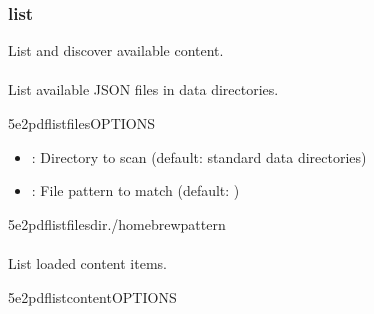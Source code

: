 \documentclass[letterpaper,10pt,english]{sphinxmanual}
\begin{document}
\subsubsection{list}
\label{\detokenize{user-guide/cli-reference:list}}
\sphinxAtStartPar
List and discover available content.


\paragraph{}
\label{\detokenize{user-guide/cli-reference:files}}
\sphinxAtStartPar
List available JSON files in data directories.

\begin{sphinxVerbatim}[commandchars=\\\{\}]
5e2pdflistfiles\PYG{o}{[}OPTIONS\PYG{o}{]}
\end{sphinxVerbatim}

\sphinxAtStartPar
{}
\begin{itemize}
\item {} 
\sphinxAtStartPar
{}: Directory to scan (default: standard data directories)

\item {} 
\sphinxAtStartPar
{}: File pattern to match (default: )

\end{itemize}

\sphinxAtStartPar
{}

\begin{sphinxVerbatim}[commandchars=\\\{\}]
5e2pdflistfiles\PYGZhy{}\PYGZhy{}dir./homebrew\PYGZhy{}\PYGZhy{}pattern
\end{sphinxVerbatim}


\paragraph{}
\label{\detokenize{user-guide/cli-reference:content}}
\sphinxAtStartPar
List loaded content items.

\begin{sphinxVerbatim}[commandchars=\\\{\}]
5e2pdflistcontent\PYG{o}{[}OPTIONS\PYG{o}{]}
\end{sphinxVerbatim}
\end{document}
